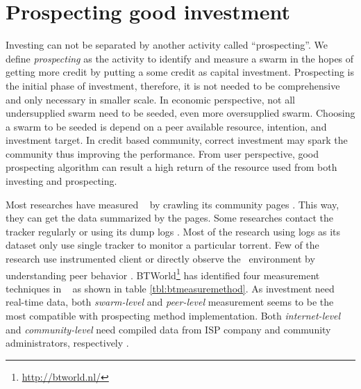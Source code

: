 \section{Prospecting good investment}

Investing can not be separated by another activity called ``prospecting''. We define \textit{prospecting} as the activity to identify and measure a swarm in the hopes of getting more credit by putting a some credit as capital investment. Prospecting is the initial phase of investment, therefore, it is not needed to be comprehensive and only necessary in smaller scale. In economic perspective, not all undersupplied swarm need to be seeded, even more oversupplied swarm. Choosing a swarm to be seeded is depend on a peer available resource, intention, and investment target. In credit based community, correct investment may spark the community thus improving the performance. From user perspective, good prospecting algorithm can result a high return of the resource used from both investing and prospecting.

Most researches have measured \bt~ by crawling its community pages \cite{2013:survivepriv:jia, 2005:bittorrentcooperation:andrade, 2014:userbehaviourprivate:jia, 2010:pubpriv:meulpolder, 2014:sustainabilitytorrent:chen, 2012:economicbt:kash, 2013:investmentcm:capota, 2009:demandsupplyres:andrade, 2011:interswarm:capota}. This way, they can get the data summarized by the pages. Some researches contact the tracker regularly or using its dump logs \cite{2011:yoshida:crawlbtnet, 2005:bittorrentcooperation:andrade,  2015:freeriderinbtcommunity:das, 2011:interswarm:capota}. Most of the research using logs as its dataset only use single tracker to monitor a particular torrent. Few of the research use instrumented client or directly observe the \bt~environment by understanding peer behavior \cite{2010:pubpriv:meulpolder, 2013:swarmevolution:su}. BTWorld\footnote{\url{http://btworld.nl/}} has identified four measurement techniques in \bt~\cite{2010:btworld:wojciechowski} as shown in table \ref{tbl:btmeasuremethod}. As investment need real-time data, both \textit{swarm-level} and \textit{peer-level} measurement seems to be the most compatible with prospecting method implementation. Both \textit{internet-level} and \textit{community-level} need compiled data from ISP company and community administrators, respectively . 

